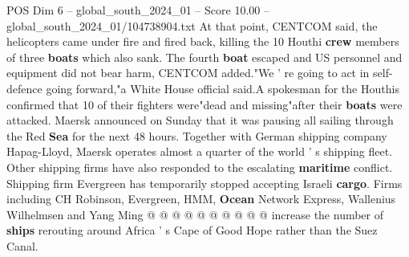 \begin{textsample}{POS Dim 6 – global\_south\_2024\_01 – Score 10.00 – global\_south\_2024\_01/104738904.txt}
At that point, CENTCOM said, the helicopters came under fire and fired back, killing the 10 Houthi \textbf{crew} members of three \textbf{boats} which also sank.
The fourth \textbf{boat} escaped and US personnel and equipment did not bear harm, CENTCOM added."We ' re going to act in self-defence going forward,"a White House official said.A spokesman for the Houthis confirmed that 10 of their fighters were"dead and missing"after their \textbf{boats} were attacked.
Maersk announced on Sunday that it was pausing all sailing through the Red \textbf{Sea} for the next 48 hours.
Together with German shipping company Hapag-Lloyd, Maersk operates almost a quarter of the world ' s shipping fleet.
Other shipping firms have also responded to the escalating \textbf{maritime} conflict.
Shipping firm Evergreen has temporarily stopped accepting Israeli \textbf{cargo}.
Firms including CH Robinson, Evergreen, HMM, \textbf{Ocean} Network Express, Wallenius Wilhelmsen and Yang Ming @ @ @ @ @ @ @ @ @ @ increase the number of \textbf{ships} rerouting around Africa ' s Cape of Good Hope rather than the Suez Canal.

\end{textsample}
